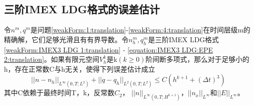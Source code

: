 \subsection{三阶IMEX LDG格式的误差估计}
\begin{theorem}
    令$n^m,q^m$是问题\eqref{weakForm:1:translation}-\ref{weakForm:4:translation}在时间层级m的精确解，它们足够光滑且有有界导数。令$n_h^m,q_h^m$是三阶IMEX LDG格式\eqref{weakForm:IMEX3 LDG 1:translation} - \ref{equation:IMEX3 LDG:EPE 2:translation}。如果有限元空间$V_h^k$是k$(k\geq  0)$阶间断多项式，那么对于足够小的h，存在正常数C与h无关，使得下列误差估计成立
    \begin{equation}
        ||n-n_h||_{L^{\infty}(0,T;L^2)} + ||q - q_h||_{L^2(0,T;L^2)} \leq C(h^{k+1} + (\Delta t)^3)
    \end{equation}
    其中C依赖于最终时间T，k，反常数$C_2$， $||n||_{L^{\infty}(0,T;H^{k+1})}$，$||n_x||_{L^{\infty}}$和$||E||_{L^{\infty}}$。
\end{theorem}

